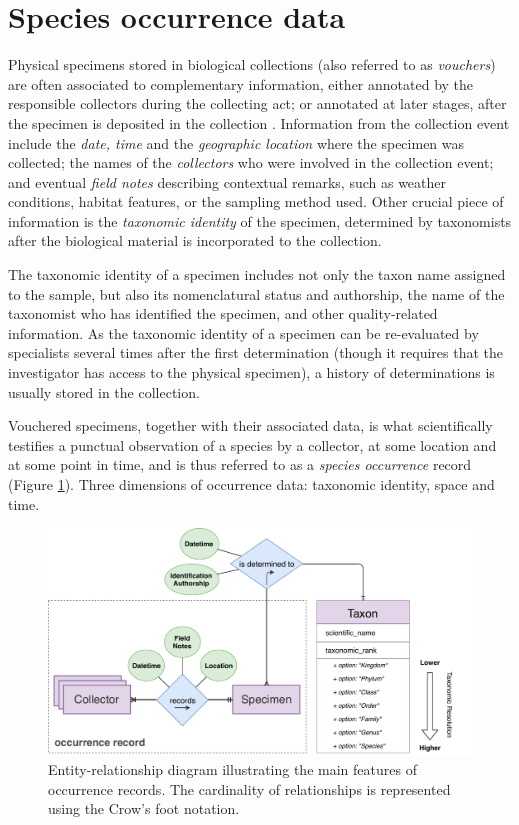 \section{Species occurrence data} \label{section:occurrence_data}
Physical specimens stored in biological collections (also referred to as \textit{vouchers}) are often associated to complementary information, either annotated by the responsible collectors during the collecting act; or annotated at later stages, after the specimen is deposited in the collection \cite{Chapman2005}.
Information from the collection event include the \textit{date, time} and the \textit{geographic location} where the specimen was collected; the names of the \textit{collectors} who were involved in the collection event; and eventual \textit{field notes} describing contextual remarks, such as weather conditions, habitat features, or the sampling method used.
Other crucial piece of information is the \textit{taxonomic identity} of the specimen, determined by taxonomists after the biological material is incorporated to the collection.

The taxonomic identity of a specimen includes not only the taxon name assigned to the sample, but also its nomenclatural status and authorship, the name of the taxonomist who has identified the specimen, and other quality-related information.
As the taxonomic identity of a specimen can be re-evaluated by specialists several times after the first determination (though it requires that the investigator has access to the physical specimen), a history of determinations is usually stored in the collection.

Vouchered specimens, together with their associated data, is what scientifically testifies a punctual observation of a species by a collector, at some location and at some point in time, and is thus referred to as a \textit{species occurrence} record (Figure \ref{fig:occurrences_er}).
%
Three dimensions of occurrence data: taxonomic identity, space and time.

\begin{figure}[h!]
  	\centering
    \includegraphics[width=\linewidth]{figures/collections_data/occurrences_er.pdf}
    \caption[Entity-relationship diagram illustrating the main features of occurrence records]{Entity-relationship diagram illustrating the main features of occurrence records. The cardinality of relationships is represented using the Crow's foot notation.}
    \label{fig:occurrences_er}
\end{figure}


